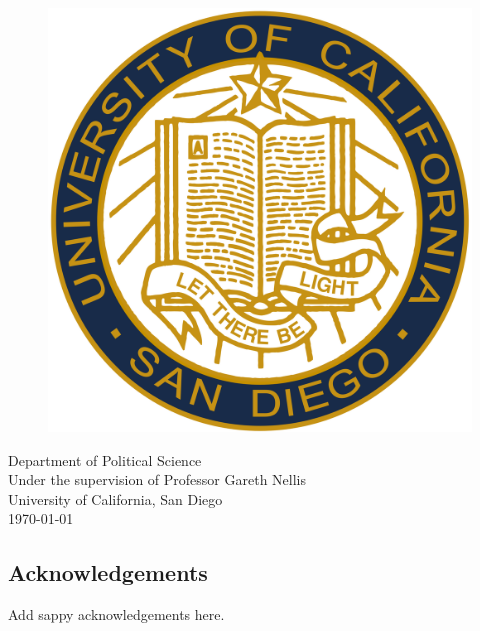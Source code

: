 \documentclass[12pt]{article}
\begin{document}
\begin{titlepage}
\vfill
\begin{figure}[H]
\begin{center}
\includegraphics[width = .2\textwidth]{ucsd_seal.png}
\end{center}
\end{figure}

\begin{center}	
Department of Political Science\\
Under the supervision of Professor Gareth Nellis\\
University of California, San Diego\\
\today
\end{center}

\end{titlepage}


\tableofcontents

\listoffigures

\listoftables

\pagebreak


\begin{center}\section*{Acknowledgements}\end{center}
Add sappy acknowledgements here.


\end{document}
